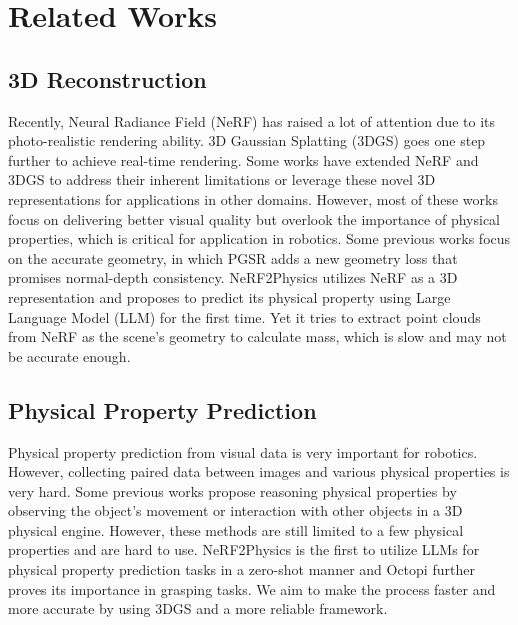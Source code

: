 \section{Related Works}
\subsection{3D Reconstruction}
Recently, Neural Radiance Field (NeRF)\cite{mildenhall2020nerf} has raised a lot of attention due to its photo-realistic rendering ability. 3D Gaussian Splatting (3DGS)\cite{kerbl3Dgaussians} goes one step further to achieve real-time rendering. Some works have extended NeRF\cite{mildenhall2020nerf} and 3DGS\cite{kerbl3Dgaussians} to address their inherent limitations\cite{chen2023nerrf3dreconstructionview, Yuan_2024, liu2024ripnerf, song2024sa} or leverage these novel 3D representations for applications in other domains\cite{wu2023mars, peng2024synctalk, zhang2024droneassistedroadgaussiansplatting}. However, most of these works focus on delivering better visual quality but overlook the importance of physical properties, which is critical for application in robotics.
Some previous works focus on the accurate geometry\cite{guedon2023sugar, Huang2DGS2024, zhang2024radegsrasterizingdepthgaussian, chen2024pgsr}, in which PGSR\cite{chen2024pgsr} adds a new geometry loss that promises normal-depth consistency. NeRF2Physics\cite{zhai2024physical} utilizes NeRF\cite{mildenhall2020nerf} as a 3D representation and proposes to predict its physical property using Large Language Model (LLM) for the first time. Yet it tries to extract point clouds from NeRF as the scene's geometry to calculate mass, which is slow and may not be accurate enough.

\subsection{Physical Property Prediction}
Physical property prediction from visual data is very important for robotics\cite{zhang2024adaptigraph, shi2023robocook, li2018learning}. However, collecting paired data between images and various physical properties is very hard. Some previous works propose reasoning physical properties by observing the object's movement or interaction with other objects in a 3D physical engine\cite{li2023pacnerf, 10.1007/978-3-319-46475-6_1, NIPS2015_d09bf415, 10160731}. However, these methods are still limited to a few physical properties and are hard to use. NeRF2Physics\cite{zhai2024physical} is the first to utilize LLMs for physical property prediction tasks in a zero-shot manner and Octopi\cite{yu2024octopi} further proves its importance in grasping tasks. We aim to make the process faster and more accurate by using 3DGS and a more reliable framework.

